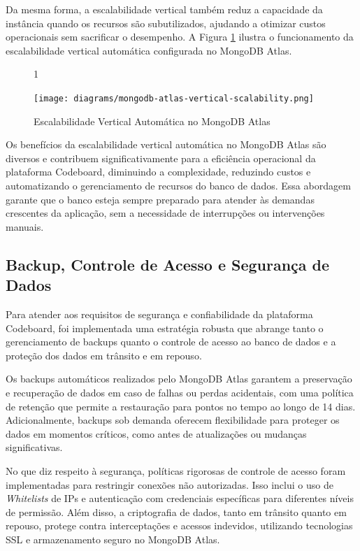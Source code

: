 Da mesma forma, a escalabilidade vertical também reduz a capacidade da instância quando os recursos são subutilizados, ajudando a otimizar custos operacionais sem sacrificar o desempenho. A Figura \ref{fig:mongodb-atlas-vertical-scalability} ilustra o funcionamento da escalabilidade vertical automática configurada no MongoDB Atlas.

\begin{figure}[H]{1\textwidth}
    \centering
    \caption{Escalabilidade Vertical Automática no MongoDB Atlas}
    \label{fig:mongodb-atlas-vertical-scalability}
    \texttt{[image: diagrams/mongodb-atlas-vertical-scalability.png]}
\end{figure} 

Os benefícios da escalabilidade vertical automática no MongoDB Atlas são diversos e contribuem significativamente para a eficiência operacional da plataforma Codeboard, diminuindo a complexidade, reduzindo custos e automatizando o gerenciamento de recursos do banco de dados. Essa abordagem garante que o banco esteja sempre preparado para atender às demandas crescentes da aplicação, sem a necessidade de interrupções ou intervenções manuais.


\subsection{Backup, Controle de Acesso e Segurança de Dados}

Para atender aos requisitos de segurança e confiabilidade da plataforma Codeboard, foi implementada uma estratégia robusta que abrange tanto o gerenciamento de backups quanto o controle de acesso ao banco de dados e a proteção dos dados em trânsito e em repouso.

Os backups automáticos realizados pelo MongoDB Atlas garantem a preservação e recuperação de dados em caso de falhas ou perdas acidentais, com uma política de retenção que permite a restauração para pontos no tempo ao longo de 14 dias. Adicionalmente, backups sob demanda oferecem flexibilidade para proteger os dados em momentos críticos, como antes de atualizações ou mudanças significativas.

No que diz respeito à segurança, políticas rigorosas de controle de acesso foram implementadas para restringir conexões não autorizadas. Isso inclui o uso de \emph{Whitelists} de IPs e autenticação com credenciais específicas para diferentes níveis de permissão. Além disso, a criptografia de dados, tanto em trânsito quanto em repouso, protege contra interceptações e acessos indevidos, utilizando tecnologias SSL e armazenamento seguro no MongoDB Atlas.


